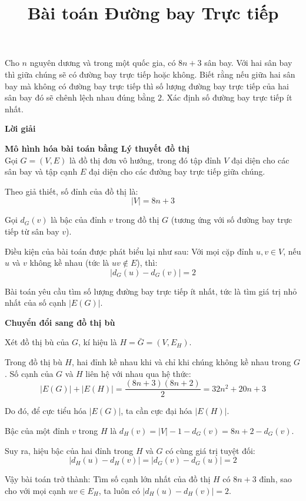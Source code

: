 \documentclass[12pt,a4paper]{article}
\title{Bài toán Đường bay Trực tiếp}
\author{}
\date{}
\theoremstyle{definition}
\begin{document}
\begin{tcolorbox}[colback=blue!5!white, colframe=blue!75!black, title=\textbf{Câu 2 - Đề thi TST chọn đổi tuyển IMO 2026}]
Cho $n$ nguyên dương và trong một quốc gia, có $8n+3$ sân bay. Với hai sân bay thì giữa chúng sẽ có đường bay trực tiếp hoặc không. Biết rằng nếu giữa hai sân bay mà không có đường bay trực tiếp thì số lượng đường bay trực tiếp của hai sân bay đó sẽ chênh lệch nhau đúng bằng $2$. Xác định số đường bay trực tiếp ít nhất.
\end{tcolorbox}

\begin{center}
	\textbf{Lời giải}
\end{center}

\textbf{Mô hình hóa bài toán bằng Lý thuyết đồ thị} \\
Gọi $G = (V, E)$ là đồ thị đơn vô hướng, trong đó tập đỉnh $V$ đại diện cho các sân bay và tập cạnh $E$ đại diện cho các đường bay trực tiếp giữa chúng.

Theo giả thiết, số đỉnh của đồ thị là:
\[
|V| = 8n + 3
\]

Gọi $d_G(v)$ là bậc của đỉnh $v$ trong đồ thị $G$ (tương ứng với số đường bay trực tiếp từ sân bay $v$).

Điều kiện của bài toán được phát biểu lại như sau: Với mọi cặp đỉnh $u, v \in V$, nếu $u$ và $v$ không kề nhau (tức là $uv \notin E$), thì:
\[
|d_G(u) - d_G(v)| = 2
\]

Bài toán yêu cầu tìm số lượng đường bay trực tiếp ít nhất, tức là tìm giá trị nhỏ nhất của số cạnh $|E(G)|$.

\textbf{Chuyển đổi sang đồ thị bù}

Xét đồ thị bù của $G$, kí hiệu là $H = \bar{G} = (V, E_H)$.

Trong đồ thị bù $H$, hai đỉnh kề nhau khi và chỉ khi chúng không kề nhau trong $G$. Số cạnh của $G$ và $H$ liên hệ với nhau qua hệ thức:
\[
|E(G)| + |E(H)| = \frac{(8n+3)(8n+2)}{2} = 32n^2 + 20n + 3
\]

Do đó, để cực tiểu hóa $|E(G)|$, ta cần cực đại hóa $|E(H)|$.

Bậc của một đỉnh $v$ trong $H$ là $d_H(v) = |V| - 1 - d_G(v) = 8n + 2 - d_G(v)$.

Suy ra, hiệu bậc của hai đỉnh trong $H$ và $G$ có cùng giá trị tuyệt đối:
\[
|d_H(u) - d_H(v)| = |d_G(v) - d_G(u)| = 2
\]

Vậy bài toán trở thành: Tìm số cạnh lớn nhất của đồ thị $H$ có $8n+3$ đỉnh, sao cho với mọi cạnh $uv \in E_H$, ta luôn có $|d_H(u) - d_H(v)| = 2$.
\end{document}
